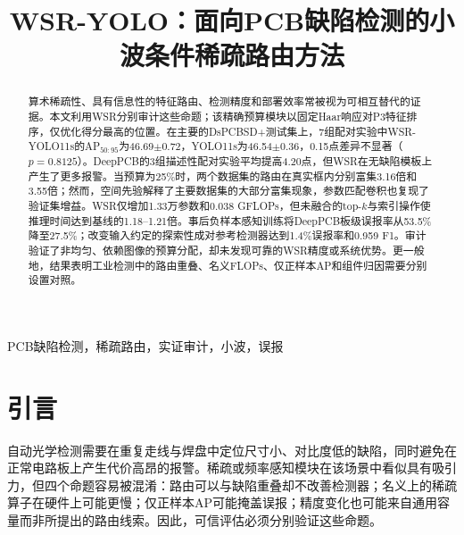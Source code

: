 \documentclass[conference]{IEEEtran}
\begin{document}
\title{WSR-YOLO：面向PCB缺陷检测的小波条件稀疏路由方法}
\author{
}
\maketitle

\begin{abstract}
算术稀疏性、具有信息性的特征路由、检测精度和部署效率常被视为可相互替代的证据。本文利用WSR分别审计这些命题；该精确预算模块以固定Haar响应对P3特征排序，仅优化得分最高的位置。在主要的DsPCBSD+测试集上，7组配对实验中WSR-YOLO11s的AP$_{50:95}$为46.69$\pm$0.72，YOLO11s为46.54$\pm$0.36，0.15点差异不显著（$p=0.8125$）。DeepPCB的3组描述性配对实验平均提高4.20点，但WSR在无缺陷模板上产生了更多报警。当预算为25\%时，两个数据集的路由在真实框内分别富集3.16倍和3.55倍；然而，空间先验解释了主要数据集的大部分富集现象，参数匹配卷积也复现了验证集增益。WSR仅增加1.33万参数和0.038 GFLOPs，但未融合的top-$k$与索引操作使推理时间达到基线的1.18--1.21倍。事后负样本感知训练将DeepPCB板级误报率从53.5\%降至27.5\%；改变输入约定的探索性成对参考检测器达到1.4\%误报率和0.959 F1。审计验证了非均匀、依赖图像的预算分配，却未发现可靠的WSR精度或系统优势。更一般地，结果表明工业检测中的路由重叠、名义FLOPs、仅正样本AP和组件归因需要分别设置对照。
\end{abstract}

\begin{IEEEkeywords}
PCB缺陷检测，稀疏路由，实证审计，小波，误报
\end{IEEEkeywords}

\fontsize{10}{12}\selectfont

\section{引言}
自动光学检测需要在重复走线与焊盘中定位尺寸小、对比度低的缺陷，同时避免在正常电路板上产生代价高昂的报警。稀疏或频率感知模块在该场景中看似具有吸引力，但四个命题容易被混淆：路由可以与缺陷重叠却不改善检测器；名义上的稀疏算子在硬件上可能更慢；仅正样本AP可能掩盖误报；精度变化也可能来自通用容量而非所提出的路由线索。因此，可信评估必须分别验证这些命题。
\end{document}
